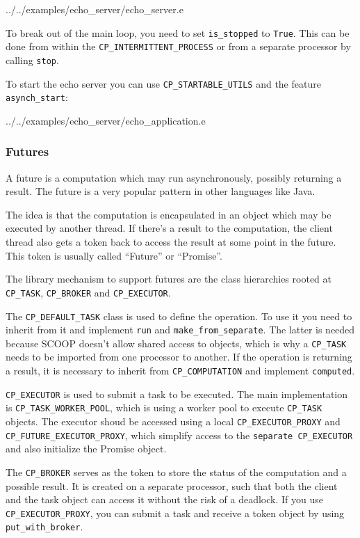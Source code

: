 \documentclass[a4paper,10pt]{report}
\begin{document}
 {../../examples/echo_server/echo_server.e}

To break out of the main loop, you need to set \lstinline!is_stopped! to \lstinline!True!.
This can be done from within the \lstinline!CP_INTERMITTENT_PROCESS! or from a separate processor by calling \lstinline!stop!.

To start the echo server you can use \lstinline!CP_STARTABLE_UTILS! and the feature \lstinline!asynch_start!:

 {../../examples/echo_server/echo_application.e}

\subsubsection{Futures}

A future is a computation which may run asynchronously, possibly returning a result.
The future is a very popular pattern in other languages like Java.

The idea is that the computation is encapsulated in an object which may be executed by another thread.
If there's a result to the computation, the client thread also gets a token back to access the result at some point in the future.
This token is usually called ``Future'' or ``Promise''.

The library mechanism to support futures are the class hierarchies rooted at \lstinline!CP_TASK!, \lstinline!CP_BROKER! and \lstinline!CP_EXECUTOR!.

The \lstinline!CP_DEFAULT_TASK! class is used to define the operation.
To use it you need to inherit from it and implement \lstinline!run! and \lstinline!make_from_separate!.
The latter is needed because SCOOP doesn't allow shared access to objects, which is why a \lstinline!CP_TASK! needs to be imported from one processor to another.
If the operation is returning a result, it is necessary to inherit from \lstinline!CP_COMPUTATION! and implement \lstinline!computed!.

\lstinline!CP_EXECUTOR! is used to submit a task to be executed.
The main implementation is \lstinline!CP_TASK_WORKER_POOL!, which is using a worker pool to execute \lstinline!CP_TASK! objects.
The executor shoud be accessed using a local \lstinline!CP_EXECUTOR_PROXY! and \lstinline!CP_FUTURE_EXECUTOR_PROXY!, which simplify access to the \lstinline!separate CP_EXECUTOR! and also initialize the Promise object.

The \lstinline!CP_BROKER! serves as the token to store the status of the computation and a possible result.
It is created on a separate processor, such that both the client and the task object can access it without the risk of a deadlock.
If you use \lstinline!CP_EXECUTOR_PROXY!, you can submit a task and receive a token object by using \lstinline!put_with_broker!.
\end{document}
